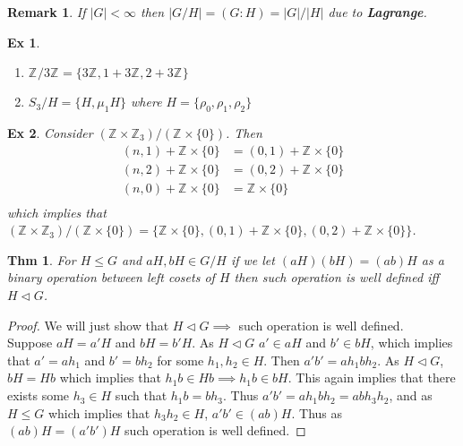 \documentclass[paper=a4, fontsize=11pt]{scrartcl}
\newcommand{\Zn}[1]{\mathbb{Z}_{#1}}
\newcommand{\nextline}{$ $ \newline \vspace{-0.15in}}
\newtheorem{theorem}{Thm}
\newtheorem{example}{Ex}
\newtheorem*{remark}{Remark}
\begin{document}
\begin{remark}
	If $|G|<\infty$ then $|G/H|=(G:H)=|G|/|H|$ due to \textbf{Lagrange}.
\end{remark}

\vspace{0.15in}

\begin{example}
	\nextline
	\begin{enumerate}
		\item  $\Zn{}/3\Zn{} = \{3\Zn{},1+3\Zn{},2+3\Zn{}\}$
		\item $S_3 / H = \{H , \mu_1 H\}$ where $H=\{ \rho_0, \rho_1, \rho_2 \}$
	\end{enumerate}
\end{example}

\vspace{0.15in}

\begin{example}
	Consider $(\Zn{}\times \Zn{3})/ (\Zn{}\times \{0\})$. Then 
	\begin{equation}\nonumber
		\begin{split}
		(n,1) + \Zn{}\times \{0\} &= (0,1) + \Zn{}\times \{0\} \\
		(n,2) + \Zn{}\times \{0\} &= (0,2) + \Zn{}\times \{0\} \\
		(n,0) + \Zn{}\times \{0\} &= \Zn{}\times \{0\} \\
		\end{split}
	\end{equation}
	which implies that $(\Zn{}\times \Zn{3})/ (\Zn{}\times \{0\}) = \{ \Zn{}\times \{0\} , (0,1) + \Zn{}\times \{0\} ,(0,2) + \Zn{}\times \{0\}  \}$.
\end{example}

\vspace{0.15in}

\begin{theorem}
	For $H\leqslant G$ and $aH,bH \in G/H$ if we let $(aH)(bH)=(ab)H$ as a binary operation between left cosets of $H$ then such operation is well defined iff $H \triangleleft G$.\\
\end{theorem}

\begin{proof}
	We will just show that $H\triangleleft G \implies$ such operation is well defined.\\[0.1in]
	Suppose $aH=a'H$ and $bH=b'H$. As $H \triangleleft G$ $a' \in aH$ and $b' \in bH$, which implies that $a'=ah_1$ and $b'=bh_2$ for some $h_1,h_2 \in H$. Then $a'b' = ah_1 bh_2$. As $H\triangleleft G$, $bH=Hb$ which implies that $h_1 b \in Hb \implies h_1 b \in bH$. This again implies that there exists some $h_3 \in H$ such that $h_1b=bh_3$. Thus $a'b'=ah_1 bh_2 = abh_3 h_2$, and as $H \leqslant G$ which implies that $h_3 h_2 \in H$, $a'b' \in (ab)H$. Thus as $(ab)H = (a'b')H$ such operation is well defined.
\end{proof}
\end{document}
